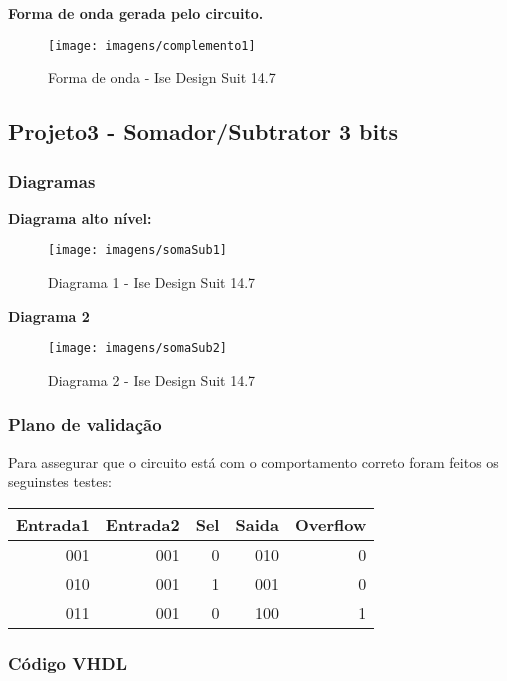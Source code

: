 \documentclass[12pts]{article}
\begin{document}
\textbf{Forma de onda gerada pelo circuito.}

\begin{figure}[!htb]
  \centering
  \texttt{[image: imagens/complemento1]}
  \caption{Forma de onda - Ise Design Suit 14.7}
  \label{figRotulo}
\end{figure}

\newpage
\subsection{Projeto3 - Somador/Subtrator 3 bits}
\subsubsection{Diagramas}

\textbf{Diagrama alto nível:}

\begin{figure}[!htb]
  \centering
  \texttt{[image: imagens/somaSub1]}
  \caption{Diagrama 1 - Ise Design Suit 14.7}
  \label{figRotulo}
\end{figure}

\newpage
\textbf{Diagrama 2 }

\begin{figure}[!htb]
  \centering
  \texttt{[image: imagens/somaSub2]}
  \caption{Diagrama 2 - Ise Design Suit 14.7}
  \label{figRotulo}
\end{figure}


\subsubsection{Plano de validação}

Para assegurar que o circuito está com o comportamento correto foram feitos os seguinstes testes:

\begin{center}
	\begin{tabular}{|r|r|r|r|r|}
		\hline
		Entrada1 & Entrada2 & Sel & Saida & Overflow\\
		\hline
		001 & 001 & 0 & 010 & 0\\
		\hline
		010 & 001 & 1 & 001 & 0\\
		\hline
		011 & 001 & 0 & 100 & 1\\
		\hline
	\end{tabular}
\end{center}

\newpage
\subsubsection{Código VHDL}
\end{document}
